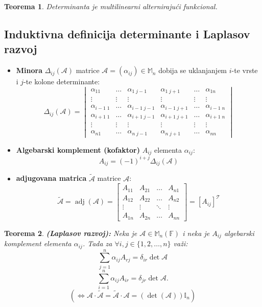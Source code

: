 \documentclass[a4paper,12pt,twoside]{report}
\newtheorem{theorem}{Teorema}[section]
\numberwithin{algorithm}{section}
\begin{document}
\begin{theorem}
    Determinanta je multilinearni alternirajući funkcional.
\end{theorem}

\subsection{Induktivna definicija determinante i Laplasov razvoj}
\begin{itemize}
    \item \textbf{Minora} $\Delta_{ij}(\mathcal{A})$ matrice $\mathcal{A} = (\alpha_{ij}) \in \mathbb{M}_n$ dobija se
    uklanjanjem $i$-te vrste i $j$-te kolone determinante:
    \[ \Delta_{ij}(\mathcal{A}) = \begin{vmatrix}
        \alpha_{11} & \dots & \alpha_{1 \; j-1} & \alpha_{1 \; j+1} & \dots & \alpha_{1n} \\
        \vdots &        \vdots & \vdots             & \vdots          & \vdots  & \vdots \\
        \alpha_{i-1 \; 1} & \dots & \alpha_{i-1 \; j-1} & \alpha_{i-1 \; j+1} & \dots & \alpha_{i-1 \; n}\\
        \alpha_{i+1 \; 1} & \dots & \alpha_{i+1 \; j-1} & \alpha_{i+1 \; j+1} & \dots & \alpha_{i+1 \; n}\\
        \vdots &        \vdots & \vdots             & \vdots          & \vdots  & \vdots \\
        \alpha_{n1} & \dots & \alpha_{n \; j-1} & \alpha_{n \; j+1} & \dots & \alpha_{nn}
    \end{vmatrix} \]
    \item \textbf{Algebarski komplement (kofaktor)} $A_{ij}$ elementa $\alpha_{ij}$:
    \[ A_{ij} = (-1)^{i+j} \Delta_{ij}(\mathcal{A}) \]
    \item \textbf{adjugovana matrica} $\tilde{\mathcal{A}}$ matrice $\mathcal{A}$:
    \[ \tilde{\mathcal{A}} = \operatorname{adj} (\mathcal{A}) = \begin{bmatrix}
        A_{11} & A_{21} & \dots & A_{n1} \\
        A_{12} & A_{22} & \dots & A_{n2} \\
        \vdots & \vdots & \ddots & \vdots \\
        A_{1n} & A_{2n} & \dots & A_{nn}
    \end{bmatrix} = [A_{ij}]^\mathcal{T}  \]
\end{itemize}

\begin{theorem}
    \textbf{(Laplasov razvoj):} Neka je $\mathcal{A} \in \mathbb{M}_n(\mathbb{F})$ i neka je $A_{ij}$ algebarski komplement elementa $\alpha_{ij}$.  Tada za $\forall i, j \in \{1, 2, \dots, n\}$ važi:
    \[ \sum_{j=1}^{n} \alpha_{ij}A_{rj} = \delta_{ir}\det \mathcal{A} \]
    \[ \sum_{i=1}^{n} \alpha_{ij}A_{ir} = \delta_{jr}\det \mathcal{A}.  \]
    \[ \left( \iff 
        \mathcal{A} \cdot \tilde{\mathcal{A}} = \tilde{\mathcal{A}} \cdot \mathcal{A} = (\operatorname{det} (\mathcal{A})) \mathbb{I}_n
     \right)   \]
\end{theorem}
\end{document}
